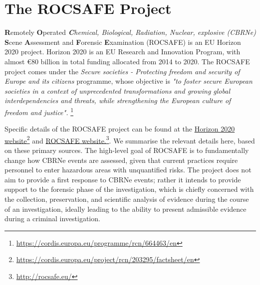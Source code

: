 \section{The ROCSAFE Project}\label{sec:ROCSAFEBG}

\textbf{R}emotely \textbf{O}perated \textit{\textbf{C}hemical, Biological, Radiation, Nuclear, explosive (CBRNe)} \textbf{S}cene \textbf{A}ssessment and \textbf{F}orensic \textbf{E}xamination (ROCSAFE) is an EU Horizon 2020 project. Horizon 2020 is an EU Research and Innovation Program, with almost €80 billion in total funding allocated from 2014 to 2020. The ROCSAFE project comes under the \textit{Secure societies - Protecting freedom and security of Europe and its citizens} programme, whose objective is \textit{"to foster secure European societies in a context of unprecedented transformations and growing global interdependencies and threats, while strengthening the European culture of freedom and justice".}
\href{https://cordis.europa.eu/programme/rcn/664463/en}{ }\footnote{\href {https://cordis.europa.eu/programme/rcn/664463/en}{https://cordis.europa.eu/programme/rcn/664463/en}}

Specific details of the ROCSAFE project can be found at the \href{https://cordis.europa.eu/project/rcn/203295/factsheet/en}{Horizon 2020 website}\footnote{\href {https://cordis.europa.eu/project/rcn/203295/factsheet/en}{https://cordis.europa.eu/project/rcn/203295/factsheet/en}} 
and 
\href{http://rocsafe.eu/}{ROCSAFE website.}\footnote{\href {http://rocsafe.eu/}{http://rocsafe.eu/}}. We summarise the relevant details here, based on these primary sources. The high-level goal of ROCSAFE is to fundamentally change how CBRNe events are assessed, given that current practices require personnel to enter hazardous areas with unquantified risks. The project does not aim to provide a first response to CBRNe events; rather it intends to provide support to the forensic phase of the investigation, which is chiefly concerned with the collection, preservation, and scientific analysis of evidence during the course of an investigation, ideally leading to the ability to present admissible evidence during a criminal investigation. 


